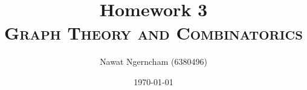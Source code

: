 \documentclass[answers]{exam}
\title{\Huge{Homework 3}
	\\
\Large\scshape{Graph Theory and Combinatorics}}
\author{Nawat Ngerncham (6380496)}
\date{\today}
\begin{document}
\maketitle

\begin{questions}
  
  
  
  
  
\end{questions}

% 
% 
\end{document}
